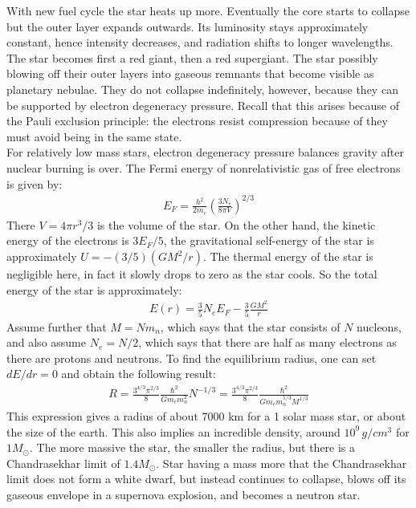\documentclass[11pt]{article}
\theoremstyle{break}
\theoremstyle{break}
\begin{document}
With new fuel cycle the star heats up more. Eventually the core starts to collapse but the outer layer expands outwards. Its luminosity stays approximately constant, hence intensity decreases, and radiation shifts to longer wavelengths. The star becomes first a red giant, then a red supergiant. The star possibly blowing off their outer layers into gaseous remnants that become visible as planetary nebulae. They do not collapse indefinitely, however, because they can be supported by electron degeneracy pressure. Recall that this arises because of the Pauli exclusion principle: the electrons
resist compression because of they must avoid being in the same state.\\

For relatively low mass stars, electron degeneracy pressure balances gravity after nuclear burning is over. The Fermi energy of nonrelativistic gas of free electrons is given by:
\begin{align*}
E_F = \frac{h^2}{2m_e}\left( \frac{3N_e}{8\pi V}\right)^{2/3}
\end{align*} 
There $V = 4\pi r^3/3$ is the volume of the star. On the other hand, the kinetic energy of the electrons is $3E_F /5$, the gravitational self-energy of the star is approximately $U = -(3/5)(GM^2/r)$. The thermal energy of the star is negligible here, in fact it slowly drops to zero as the star cools. So the total energy of the star is approximately:
\begin{align*}
E(r) = \frac{3}{5}N_e E_F - \frac{3}{5} \frac{GM^2}{r}
\end{align*}
Assume further that $M = Nm_n$, which says that the star consists of $N$ nucleons, and also assume $N_e = N/2$, which says that there are half as many electrons as there are protons and neutrons. To find the equilibrium radius, one can set $dE/dr = 0$ and obtain the following result:
\begin{align*}
R = \frac{3^{4/3}\pi^{2/3}}{8}\frac{\hbar^2}{Gm_em_n^2}N^{-1/3} = \frac{3^{4/3}\pi^{2/3}}{8}\frac{\hbar^2}{Gm_em_n^{5/3}M^{1/3}}
\end{align*}
This expression gives a radius of about 7000 km for a 1 solar mass star, or about the size of the earth. This also implies an incredible density, around $10^9\, g/cm^3$ for $1M_{\odot}$. The more massive the star, the smaller the radius, but there is a Chandrasekhar limit of  $1.4M_{\odot}$. Star having a mass more that the Chandrasekhar limit does not form a white dwarf, but instead continues to
collapse, blows off its gaseous envelope in a supernova explosion, and becomes a neutron star. \\
\end{document}
